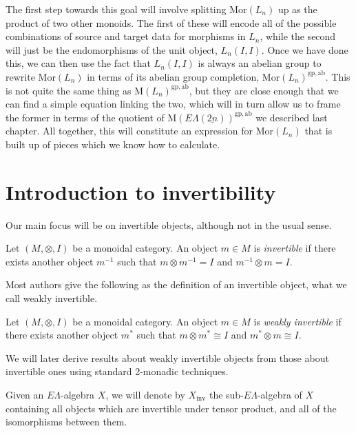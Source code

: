 \documentclass{amsbook} %
\newcommand{\ELnn}{E\Lambda(\underline{2n})}
\numberwithin{section}{chapter}
\begin{document}
The first step towards this goal will involve splitting $\mathrm{Mor}(L_n)$ up as the product of two other monoids. The first of these will encode all of the possible combinations of source and target data for morphisms in $L_n$, while the second will just be the endomorphisms of the unit object, $L_n(I, I)$. 
Once we have done this, we can then use the fact that $L_n(I, I)$ is always an abelian group to rewrite $\mathrm{Mor}(L_n)$ in terms of its abelian group completion, $\mathrm{Mor}(L_n)^{\mathrm{gp, ab}}$. This is not quite the same thing as $\mathrm{M}(L_n)^{\mathrm{gp, ab}}$, but they are close enough that we can find a simple equation linking the two, which will in turn allow us to frame the former in terms of the quotient of $\mathrm{M}(\ELnn)^{\mathrm{gp, ab}}$ we described last chapter. All together, this will constitute an expression for $\mathrm{Mor}(L_n)$ that is built up of pieces which we know how to calculate.

\section{Introduction to invertibility}

Our main focus will be on invertible objects, although not in the usual sense.
\begin{Defi}
Let $(M, \otimes, I)$ be a monoidal category. An object $m \in M$ is \emph{invertible} if there exists another object $m^{-1}$ such that $m \otimes m^{-1} = I$ and $m^{-1} \otimes m = I$.

\end{Defi}

Most authors give the following as the definition of an invertible object, what we call weakly invertible.
\begin{Defi}
Let $(M, \otimes, I)$ be a monoidal category. An object $m \in M$ is \emph{weakly invertible} if there exists another object $m^{*}$ such that $m \otimes m^{*} \cong I$ and $m^{*} \otimes m \cong I$.

\end{Defi}

We will later derive results about weakly invertible objects from those about invertible ones using standard 2-monadic techniques.



\begin{Defi} Given an $E\Lambda$-algebra $X$, we will denote by $X_{\mathrm{inv}}$ the sub-$E\Lambda$-algebra of $X$ containing all objects which are invertible under tensor product, and all of the isomorphisms between them. \end{Defi} 
\end{document}
